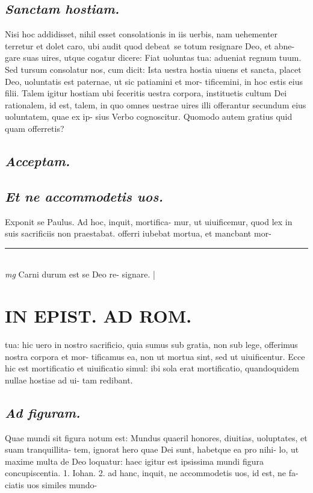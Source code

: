 \documentclass{article}
\begin{document}
\begin{pages}
\subsection*{\textit{Sanctam hostiam. }}\pstart Nisi hoc addidisset, nihil esset consolationis in iis uerbis, nam uehementer terretur et dolet caro, ubi audit quod debeat se totum resignare Deo, et abne- gare suas uires, utque cogatur dicere: Fiat uoluntas tua: adueniat regnum tuum. Sed tursum consolatur nos, cum dicit: Ista uestra hostia uiuens et sancta, placet Deo, uoluntatis est paternae, ut sic patiamini et mor- tificemini, in hoc estis eius filii. Talem igitur hostiam ubi feceritis uestra corpora, instituetis cultum Dei rationalem, id est, talem, in quo omnes uestrae uires illi offerantur secundum eius uoluntatem, quae ex ip- sius Verbo cognoscitur. Quomodo autem gratius quid quam offerretis?  \pend
{}
{}
\subsection*{\textit{Acceptam. }}
{}
\subsection*{\textit{Et ne accommodetis uos. }}\pstart Exponit se Paulus. Ad hoc, inquit, mortifica- mur, ut uiuificemur, quod lex in suis sacrificiis non praestabat. offerri iubebat mortua, et mancbant mor-  \pend
\vspace{0.5cm}\noindent
\vspace{0.2cm}\rule{1cm}{0.2pt}\\ 
\hspace{0.2cm}\textit{mg}
\footnotesize Carni durum est se Deo re- signare.  
\normalsize| 
\section*{IN EPIST. AD ROM.  }
\marginpar{[ p.141 ]}\pstart tua: hic uero in nostro sacrificio, quia sumus sub gratia, non sub lege, offerimus nostra corpora et mor- tificamus ea, non ut mortua sint, sed ut uiuificentur. Ecce hic est mortificatio et uiuificatio simul: ibi sola erat mortificatio, quandoquidem nullae hostiae ad ui- tam redibant.   \pend
{}
{}
\subsection*{\textit{Ad figuram. }}\pstart Quae mundi sit figura notum est: Mundus quaeril honores, diuitias, uoluptates, et suam tranquillita- tem, ignorat hero quae Dei sunt, habetque ea pro nihi- lo, ut maxime multa de Deo loquatur: haec igitur est ipsissima mundi figura concupiscentia. 1. Iohan. 2.  ad hanc, inquit, ne accommodetis uos, id est, ne fa- ciatis uos similes mundo-  \pend
{}
{}

\end{pages}
\end{document}
